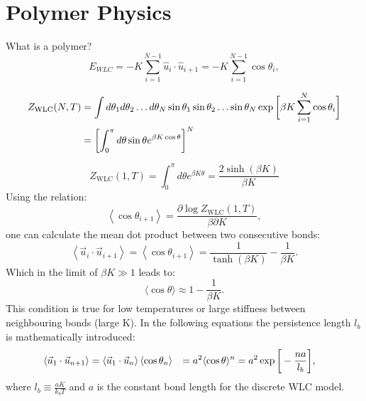 \section{Polymer Physics}

What is a polymer?\\

\begin{equation}
    E_{WLC}= -K \sum_{i=1}^{N-1} \hat u_i \cdot \hat u_{i+1} = -K \sum_{i=1}^{N-1} \cos\theta_i,
\end{equation}

\begin{equation}
\begin{aligned}
    \label{210}
    Z_{\mathrm{WLC}}(N, T)
    &= \int d \theta_{1} d \theta_{2} \ldots d \theta_{N} \sin \theta_{1} \sin \theta_{2} \ldots \sin \theta_{N} \exp \bigg{[} \beta K \sum_{i=1}^{N} \cos \theta_{i} \bigg{]} \\
    &= \left[\int_{0}^{\pi} d \theta \sin \theta e^{\beta K \cos \theta}\right]^{N}
\end{aligned}
\end{equation}

\begin{equation}
    Z_{\mathrm{WLC}}(1, T)=\int_{0}^{\pi} d \theta e^{\beta K \theta}=\frac{2 \sinh(\beta
    K)}{\beta K}
\end{equation}
Using the relation:
\begin{equation}
    \left\langle\cos \theta_{i+1}\right\rangle
    =\frac{\partial \log Z_{\mathrm{WLC}}(1, T)}{\beta \partial K},
\end{equation}
one can calculate the mean dot product between two consecutive bonds:
\begin{equation}
    \left\langle\vec{u}_{i} \cdot \vec{u}_{i+1}\right\rangle
    = \left\langle\cos \theta_{i+1}\right\rangle
    = \frac{1}{\tanh(\beta K)} - \frac{1}{\beta K}.
\end{equation}
Which in the limit of $\beta K \gg 1$ leads to:
\begin{equation}
    \langle\cos \theta\rangle \approx 1-\frac{1}{\beta K}.
\end{equation}
This condition is true for low temperatures or large stiffness between neighbouring bonds (large K). In the following equations the persistence length $l_b$ is mathematically introduced:
\begin{equation}
\begin{aligned}
    \left\langle\vec{u}_{1} \cdot \vec{u}_{n+1}\right\rangle
    &=\left\langle\vec{u}_{1} \cdot \vec{u}_{n}\right\rangle\left\langle\cos
    \theta_{n}\right\rangle
    &= a^{2}\langle\cos \theta\rangle^{n}
    &=a^{2} \exp \bigg{[} -\frac{n a}{l_{b}} \bigg{]},
\end{aligned}
\end{equation}
where $l_b \equiv \frac{a K}{k_{b} T}$ and $a$ is the constant bond length for the discrete WLC model.

